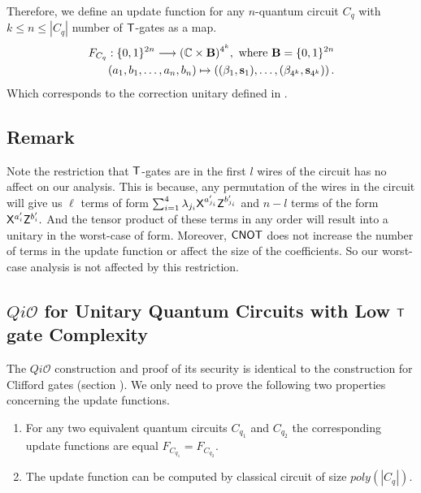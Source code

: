 Therefore, we define an update function for any $n$-quantum circuit $C_q$ with $k\leq n\leq |C_q|$ number of ${\sf T}$-gates as a map.
\begin{equation}
\label{nqubit:eq10}
\begin{aligned}
 F_{C_q}:\{0,1\}^{2n}\longrightarrow  (\mathbb{C} \times {\bf B})^{4^k}, \mbox{ where } {\bf B}=\{0,1\}^{2n}\\
  (a_1,b_1,\ldots, a_n,b_n) \mapsto \left((\beta_1, {\bf s}_1),\dots, (\beta_{4^k}, {\bf s}_{4^k})\right).
\end{aligned}
\end{equation}
Which corresponds to the correction unitary defined in .
\subsection{Remark}
\label{remark:nqubit-correction1}
Note the restriction that ${\sf T}$-gates are in the first $l$ wires of the circuit has no affect on our analysis. This is because, any permutation of the wires in the circuit will give us $\ell$ terms of form $\sum_{i=1}^4 \lambda_{j_i} {\sf X}^{a_{j_i}^\prime} {\sf Z}^{b_{j_i}^\prime}$ and $n-l$ terms of the form ${\sf X}^{a_{i}^\prime} {\sf Z}^{b_{i}^\prime}.$  And the tensor product of these terms in any order will result into a unitary in the worst-case of form. Moreover, ${\sf CNOT}$ does not increase the number of terms in the update function or affect the size of the coefficients. So our worst-case analysis is not affected by this restriction.


\subsection{$Qi\mathcal{O}$ for Unitary Quantum Circuits with Low ${\sf T}$ gate Complexity}
The $Qi\mathcal{O}$ construction and proof of its security is identical to the  construction for Clifford gates (section ). We only need to prove the following two properties concerning the update functions.
\begin{enumerate}
\item For any two equivalent quantum circuits $C_{q_1}$ and $C_{q_2}$ the corresponding update functions are equal $F_{C_{q_1}}=F_{C_{q_2}}.$
\item The update function can be computed by classical circuit of size $poly(|C_q|).$
\end{enumerate}

%



